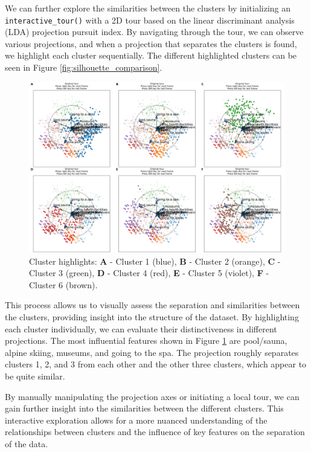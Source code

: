\documentclass[article]{ajs}
\begin{document}
We can further explore the similarities between the clusters by initializing an \texttt{interactive\_tour()} with a 2D tour based on the linear discriminant analysis (LDA) projection pursuit index. By navigating through the tour, we can observe various projections, and when a projection that separates the clusters is found, we highlight each cluster sequentially. The different highlighted clusters can be seen in Figure \ref{fig:silhouette_comparison}.

\begin{figure}[h!]
    \centering
    \includegraphics[width=1\textwidth]{winter_activ_cluster_highlights.png}
    \caption{Cluster highlights: \textbf{A} - Cluster 1 (blue), \textbf{B} - Cluster 2 (orange), \textbf{C} - Cluster 3 (green), \textbf{D} - Cluster 4 (red), \textbf{E} - Cluster 5 (violet), \textbf{F} - Cluster 6 (brown).}
    \label{fig:winter_activ_cluster_highlights}
\end{figure}

This process allows us to visually assess the separation and similarities between the clusters, providing insight into the structure of the dataset. By highlighting each cluster individually, we can evaluate their distinctiveness in different projections. The most influential features shown in Figure \ref{fig:winter_activ_cluster_highlights} are pool/sauna, alpine skiing, museums, and going to the spa. The projection roughly separates clusters 1, 2, and 3 from each other and the other three clusters, which appear to be quite similar. 

By manually manipulating the projection axes or initiating a local tour, we can gain further insight into the similarities between the different clusters. This interactive exploration allows for a more nuanced understanding of the relationships between clusters and the influence of key features on the separation of the data.
\end{document}
